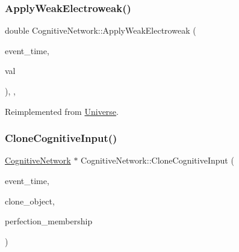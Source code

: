 \subsubsection{\texorpdfstring{Apply\+Weak\+Electroweak()}{ApplyWeakElectroweak()}}
{\footnotesize\ttfamily double Cognitive\+Network\+::\+Apply\+Weak\+Electroweak (\begin{DoxyParamCaption}\item[{std\+::chrono\+::time\+\_\+point$<$ \mbox{\hyperlink{universe_8h_a0ef8d951d1ca5ab3cfaf7ab4c7a6fd80}{Clock}} $>$}]{event\+\_\+time,  }\item[{double}]{val }\end{DoxyParamCaption})\hspace{0.3cm}{\ttfamily [inline]}, {\ttfamily [final]}, {\ttfamily [virtual]}}



Reimplemented from \mbox{\hyperlink{classUniverse_a46a906baabb63e5d31f8b48ea1fae52e}{Universe}}.

\mbox{\label{classCognitiveNetwork_a058cb2b044d56268e36f153fac21084e}} 
\subsubsection{\texorpdfstring{Clone\+Cognitive\+Input()}{CloneCognitiveInput()}}
{\footnotesize\ttfamily \mbox{\hyperlink{classCognitiveNetwork}{Cognitive\+Network}} $\ast$ Cognitive\+Network\+::\+Clone\+Cognitive\+Input (\begin{DoxyParamCaption}\item[{std\+::chrono\+::time\+\_\+point$<$ \mbox{\hyperlink{universe_8h_a0ef8d951d1ca5ab3cfaf7ab4c7a6fd80}{Clock}} $>$}]{event\+\_\+time,  }\item[{\mbox{\hyperlink{classCognitiveNetwork}{Cognitive\+Network}} $\ast$}]{clone\+\_\+object,  }\item[{double}]{perfection\+\_\+membership }\end{DoxyParamCaption})}

\mbox{\label{classCognitiveNetwork_aeaf2883b25dbf1eefd11c2d92efe8816}} 
